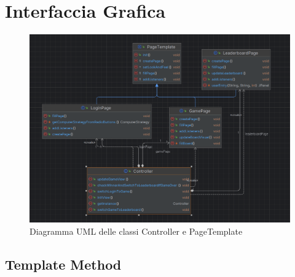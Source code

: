\newpage
\section{Interfaccia Grafica}\label{sec:interfaccia-grafica}

\begin{figure}
    \centering
    \includegraphics[scale=0.4]{img/controller-uml}
    \caption{Diagramma UML delle classi Controller e PageTemplate}
    \label{fig:controller-uml}
\end{figure}

\subsection{Template Method}\label{subsec:template-method}


